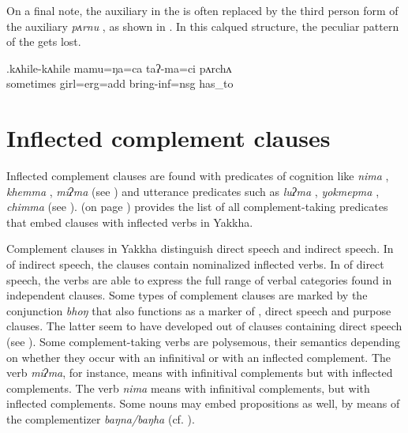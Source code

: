 On a final note, the auxiliary in the   is often replaced by the third person form of the  auxiliary \emph{pʌrnu} , as shown in \Next. In this calqued structure, the peculiar  pattern of the  gets lost.

\exg.kʌhile-kʌhile mamu=ŋa=ca  taʔ-ma=ci       pʌrchʌ\\ 
sometimes girl{\sc =erg=add} bring-{\sc inf=nsg} {\sc has\_to}\\
 

 		
\section{Inflected complement clauses} \label{fin-comp}

Inflected complement clauses are found with predicates of  cognition like \emph{nima} , \emph{khemma} , \emph{miʔma}   (see ) and utterance predicates such as  \emph{luʔma} , \emph{yokmepma} , \emph{chimma}  (see ).  (on page \pageref{overview-all}) provides the list of all complement-taking predicates that embed clauses with inflected verbs in Yakkha. 

Complement clauses in Yakkha distinguish direct speech and indirect speech. In  of indirect speech, the  clauses contain nominalized inflected verbs.  In  of direct speech, the verbs are able to express the full range of verbal categories found in independent clauses. Some types of complement clauses are marked by the conjunction \emph{bhoŋ} that also functions as a marker of ,  direct speech and purpose clauses. The latter seem to have developed out of clauses containing direct  speech (see ). Some complement-taking verbs are polysemous, their semantics depending on whether they occur with an infinitival or with an inflected complement. The verb \emph{miʔma}, for instance, means  with infinitival complements but  with inflected complements. The verb \emph{nima} means  with infinitival complements, but  with inflected complements. Some nouns may embed propositions  as well, by means of the complementizer \emph{baŋna/baŋha} (cf. ). 


